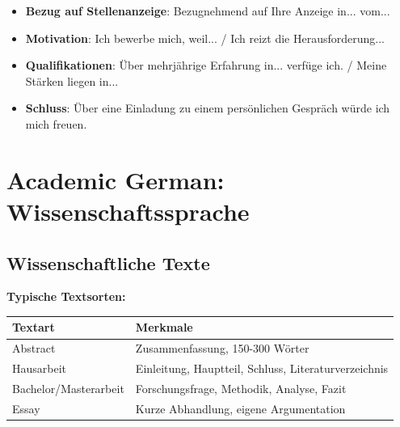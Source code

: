 \begin{itemize}
    \item \textbf{Bezug auf Stellenanzeige}: Bezugnehmend auf Ihre Anzeige in... vom...
    \item \textbf{Motivation}: Ich bewerbe mich, weil... / Ich reizt die Herausforderung...
    \item \textbf{Qualifikationen}: Über mehrjährige Erfahrung in... verfüge ich. / Meine Stärken liegen in...
    \item \textbf{Schluss}: Über eine Einladung zu einem persönlichen Gespräch würde ich mich freuen.
\end{itemize}

\chapterend

\chapter{Academic German: Wissenschaftssprache}
\label{cha:Academic}

\section{Wissenschaftliche Texte}
\label{sec:WissenschaftlicheTexte}

\bigskip
\noindent\textbf{Typische Textsorten:}

\begin{center}
\begin{tabular}{|l|p{8cm}|}
\hline
Textart & Merkmale \\ \hline
Abstract & \begin{minipage}{8cm}Zusammenfassung, 150-300 Wörter\end{minipage} \\ \hline
Hausarbeit & \begin{minipage}{8cm}Einleitung, Hauptteil, Schluss, Literaturverzeichnis\end{minipage} \\ \hline
Bachelor/Masterarbeit & \begin{minipage}{8cm}Forschungsfrage, Methodik, Analyse, Fazit\end{minipage} \\ \hline
Essay & \begin{minipage}{8cm}Kurze Abhandlung, eigene Argumentation\end{minipage} \\ \hline
\end{tabular}
\end{center}

